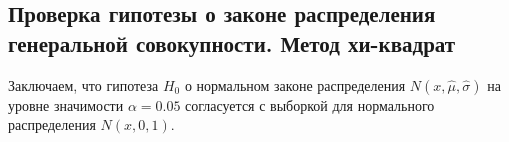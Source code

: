 \subsection{Проверка гипотезы о законе распределения генеральной совокупности. Метод хи-квадрат}
	
	Заключаем, что гипотеза $H_{0}$ о нормальном законе распределения $N(x,\hat{\mu}, \hat{\sigma})$ на уровне значимости $\alpha = 0.05$ согласуется с выборкой для нормального распределения $N(x, 0, 1)$.
	\newline